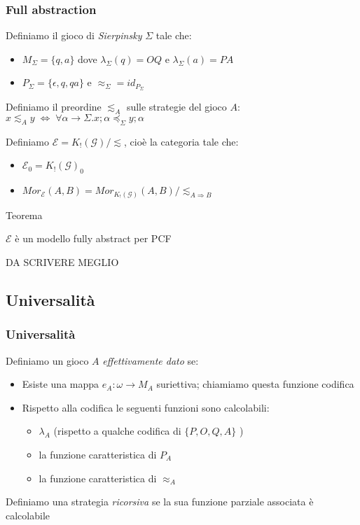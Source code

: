 \documentclass{beamer}
\begin{document}
\begin{frame}
	
	\frametitle{Full abstraction}
	
	Definiamo il gioco di \emph{Sierpinsky} $\Sigma$ tale che:
	\begin{itemize}
		\item $M_\Sigma = \{ q,a \}$ dove $\lambda_\Sigma (q)=OQ$ e $\lambda_\Sigma (a)=PA$
		\item $P_\Sigma = \{ \epsilon , q , qa \}$ e $\approx_\Sigma = id_{P_\Sigma}$
	\end{itemize}
	
	Definiamo il preordine $\lesssim_A$ sulle strategie del gioco $A$: $x \lesssim_A y \; \Leftrightarrow \; \forall \alpha \rightarrow \Sigma . x;\alpha \preccurlyeq_\Sigma y;\alpha$
	
	Definiamo $\mathcal{E} = K_!(\mathcal{G}) / \lesssim$, cioè la categoria tale che:
	\begin{itemize}
		\item $\mathcal{E}_0 = K_!(\mathcal{G})_0$
		\item $Mor_{\mathcal{E}}(A,B) = Mor_{K_!(\mathcal{G})}(A,B) / \lesssim_{A\Rightarrow B}$
	\end{itemize}

	
	\begin{block}{Teorema}
		
		$\mathcal{E}$ è un modello fully abstract per PCF
		
	\end{block}
	
	DA SCRIVERE MEGLIO
	
\end{frame}

\subsection{Universalità}

\begin{frame}
	
	\frametitle{Universalità}
	
	Definiamo un gioco $A$ \emph{effettivamente dato} se:
	\begin{itemize}
		\item Esiste una mappa $e_A : \omega \rightarrow M_A$ suriettiva; chiamiamo questa funzione codifica
		\item Rispetto alla codifica le seguenti funzioni sono calcolabili:
		\begin{itemize}
			\item $\lambda_A$ (rispetto a qualche codifica di $\{ P,O,Q,A \}$ )
			\item la funzione caratteristica di $P_A$
			\item la funzione caratteristica di $\approx_A$
		\end{itemize}
		
	\end{itemize}
	
	Definiamo una strategia \emph{ricorsiva} se la sua funzione parziale associata è calcolabile
	
	
\end{frame}
\end{document}
